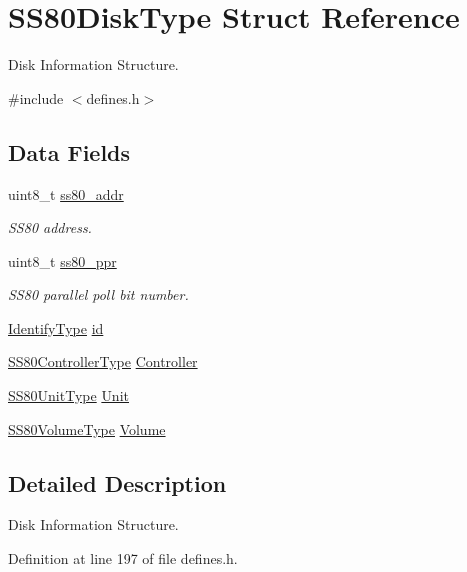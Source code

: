 \hypertarget{structSS80DiskType}{}\section{S\+S80\+Disk\+Type Struct Reference}
\label{structSS80DiskType}


Disk Information Structure.  




{\ttfamily \#include $<$defines.\+h$>$}

\subsection*{Data Fields}
\begin{DoxyCompactItemize}
\item 
uint8\+\_\+t \hyperlink{structSS80DiskType_af41bd36ae711bae5aaa86722798ea281}{ss80\+\_\+addr}
\begin{DoxyCompactList}\small\item\em S\+S80 address. \end{DoxyCompactList}\item 
uint8\+\_\+t \hyperlink{structSS80DiskType_a93cbe7ea84a0d2d33ecc4eaae8367bd5}{ss80\+\_\+ppr}
\begin{DoxyCompactList}\small\item\em S\+S80 parallel poll bit number. \end{DoxyCompactList}\item 
\hyperlink{structIdentifyType}{Identify\+Type} \hyperlink{structSS80DiskType_a051107cea479ec682a317e0c44ca5f51}{id}
\item 
\hyperlink{structSS80ControllerType}{S\+S80\+Controller\+Type} \hyperlink{structSS80DiskType_a2fe71dc8a453df2e8cde8e8dded1bb63}{Controller}
\item 
\hyperlink{structSS80UnitType}{S\+S80\+Unit\+Type} \hyperlink{structSS80DiskType_a53779c62a77383b446ab9097ed70481d}{Unit}
\item 
\hyperlink{structSS80VolumeType}{S\+S80\+Volume\+Type} \hyperlink{structSS80DiskType_a34eaa5702599d69fcd7c2fc7e13a2256}{Volume}
\end{DoxyCompactItemize}


\subsection{Detailed Description}
Disk Information Structure. 

Definition at line 197 of file defines.\+h.



